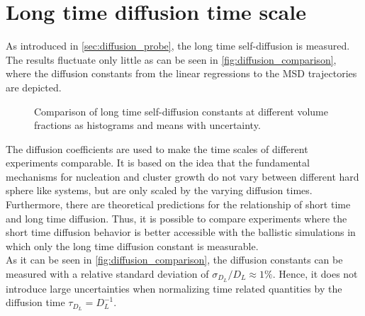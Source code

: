 \section{Long time diffusion time scale}
\label{sec:diffusion_metastable_liquid}
As introduced in \autoref{sec:diffusion_probe}, the long time self-diffusion is measured. The results fluctuate only little as can be seen in \autoref{fig:diffusion_comparison}, where the diffusion constants from the linear regressions to the MSD trajectories are depicted.\\

\begin{figure}[h]
 \hspace{0.5cm}
\caption[Long time self-diffusion constant measurements from production data]{Comparison of long time self-diffusion constants at different volume fractions as histograms and means with uncertainty.}
\label{fig:diffusion_comparison}
\end{figure}

The diffusion coefficients are used to make the time scales of different experiments comparable. It is based on the idea that the fundamental mechanisms for nucleation and cluster growth do not vary between different hard sphere like systems, but are only scaled by the varying diffusion times. Furthermore, there are theoretical predictions for the relationship of short time and long time diffusion. Thus, it is possible to compare experiments where the short time diffusion behavior is better accessible with the ballistic simulations in which only the long time diffusion constant is measurable.\\

As it can be seen in \autoref{fig:diffusion_comparison}, the diffusion constants can be measured with a relative standard deviation of $\sigma_{D_L}/D_L \approx 1\%$. Hence, it does not introduce large uncertainties when normalizing time related quantities by the diffusion time $\tau_{D_L} = D_L^{-1}$.

